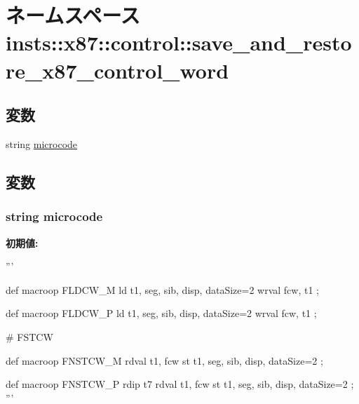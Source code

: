 \hypertarget{namespaceinsts_1_1x87_1_1control_1_1save__and__restore__x87__control__word}{
\section{ネームスペース insts::x87::control::save\_\-and\_\-restore\_\-x87\_\-control\_\-word}
\label{namespaceinsts_1_1x87_1_1control_1_1save__and__restore__x87__control__word}
}
\subsection*{変数}
\begin{DoxyCompactItemize}
\item 
string \hyperlink{namespaceinsts_1_1x87_1_1control_1_1save__and__restore__x87__control__word_a770f11a173e99389a8802f0107ed8f52}{microcode}
\end{DoxyCompactItemize}


\subsection{変数}
\hypertarget{namespaceinsts_1_1x87_1_1control_1_1save__and__restore__x87__control__word_a770f11a173e99389a8802f0107ed8f52}{
\subsubsection[{microcode}]{\setlength{\rightskip}{0pt plus 5cm}string {\bf microcode}}}
\label{namespaceinsts_1_1x87_1_1control_1_1save__and__restore__x87__control__word_a770f11a173e99389a8802f0107ed8f52}
{\bfseries 初期値:}
\begin{DoxyCode}
'''

def macroop FLDCW_M {
    ld t1, seg, sib, disp, dataSize=2
    wrval fcw, t1
};

def macroop FLDCW_P {
    ld t1, seg, sib, disp, dataSize=2
    wrval fcw, t1
};

# FSTCW

def macroop FNSTCW_M {
    rdval t1, fcw
    st t1, seg, sib, disp, dataSize=2
};

def macroop FNSTCW_P {
    rdip t7
    rdval t1, fcw
    st t1, seg, sib, disp, dataSize=2
};
'''
\end{DoxyCode}
